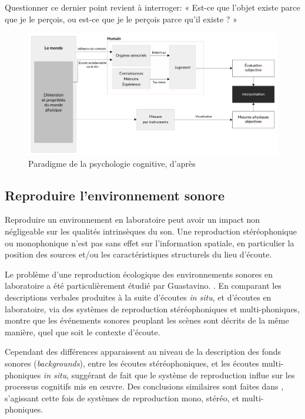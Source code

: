 Questionner ce dernier point revient à interroger: « Est-ce que l'objet existe parce que je le perçois, ou est-ce que je le perçois parce qu'il existe ? »

\begin{figure}[t]
        \myfloatalign
        \includegraphics[width=\linewidth]{gfx/ch_3/paradigmepsychoco}
        \caption[Paradigme de la psychologie cognitive]{Paradigme de la psychologie cognitive, d'après \citep{maffiolo_caracterisation_1999}}\label{fig:paradigmePsychoCo}
\end{figure}

\subsection{Reproduire l'environnement sonore}
\label{sec:ch3_soundReproduction}

Reproduire un environnement en laboratoire peut avoir un impact non négligeable sur les qualités intrinsèques du son. Une reproduction stéréophonique ou monophonique n'est pas sans effet sur l'information spatiale, en particulier la position des sources et/ou les caractéristiques structurels du lieu d'écoute.

Le problème d'une reproduction écologique des environnements sonores en laboratoire a été particulièrement étudié par Guastavino. \citep{guastavino2003approche,guastavino2004perceptual,guastavino2005ecological}. En comparant les descriptions verbales produites à la suite d'écoutes \emph{in situ}, et d'écoutes en laboratoire, via des systèmes de reproduction stéréophoniques et multi-phoniques, \citep{guastavino2005ecological} montre que les événements sonores peuplant les scènes sont décrits de la même manière, quel que soit le contexte d'écoute.

Cependant des différences apparaissent au niveau de la description des fonds sonores (\emph{backgrounds}), entre les écoutes stéréophoniques, et les écoutes multi-phoniques \emph{in situ}, suggérant de fait que le système de reproduction influe sur les processus cognitifs mis en œuvre. Des conclusions similaires sont faites dans \citep{guastavino2004perceptual}, s'agissant cette fois de systèmes de reproduction mono, stéréo, et multi-phoniques. 

